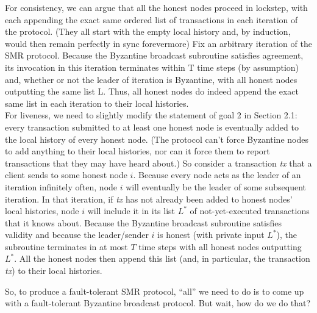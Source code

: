  \begin{myproof}
For consistency, we can argue that all the honest nodes proceed in lockstep, with
each appending the exact same ordered list of transactions in each iteration of the protocol.
(They all start with the empty local history and, by induction, would then remain perfectly
in sync forevermore) Fix an arbitrary iteration of the SMR protocol. Because the Byzantine
broadcast subroutine satisfies agreement, its invocation in this iteration terminates within T
time steps (by assumption) and, whether or not the leader of iteration is Byzantine, with all
honest nodes outputting the same list L. Thus, all honest nodes do indeed append the exact same list in each iteration to their
local histories.\\
For liveness, we need to slightly modify the statement of goal 2 in Section 2.1: every
transaction submitted to at least one honest node is eventually added to the local history of
every honest node. (The protocol can’t force Byzantine nodes to add anything to their local
histories, nor can it force them to report transactions that they may have heard about.) So consider a transaction \textit{tx} that a client sends to some honest node $i$. Because every node
acts as the leader of an iteration infinitely often, node $i$ will eventually be the leader of some
subsequent iteration. In that iteration, if \textit{tx} has not already been added to honest nodes’
local histories, node $i$ will include it in its list $L^*$ of not-yet-executed transactions that it
knows about. Because the Byzantine broadcast subroutine satisfies validity and because the
leader/sender $i$ is honest (with private input $L^*$), the subroutine terminates in at most $T$
time steps with all honest nodes outputting $L^*$. All the honest nodes then append this list
(and, in particular, the transaction \textit{tx}) to their local histories.
 \end{myproof}

So, to produce a fault-tolerant SMR protocol, “all” we need to do is to come up with a
fault-tolerant Byzantine broadcast protocol. But wait, how do we do that?\\


